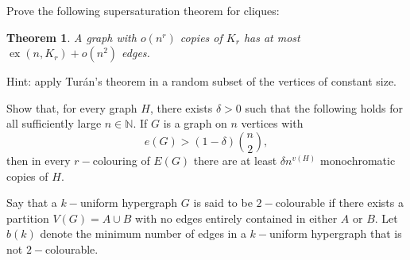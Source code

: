 \documentclass[english]{IMTexam}
\author{Isabella B. Amaral}
\newtheorem{theorem}{Theorem}
\DeclareMathOperator{\ex}{ex}
\begin{document}
	
	\maketitle
	
	\begin{questions}
		\question Prove the following supersaturation theorem for cliques:
		
		\begin{theorem}
			A graph with $ o(n^{r}) $ copies of $ K_r $ has at most $ \ex(n, K_r) + o(n^{2}) $ edges.
		\end{theorem}
	
		Hint: apply Turán’s theorem in a random subset of the vertices of constant size.
		
		\begin{solution}
			
		\end{solution}
		
		\question Show that, for every graph $ H $, there exists $ \delta > 0 $ such that the following holds for all sufficiently large $ n \in \mathbb{N} $. If $ G $ is a graph on $ n $ vertices with
		\[ e(G)>(1-\delta)\binom{n}{2}, \]
		then in every $ r- $colouring of $ E(G) $ there are at least $ \delta n^{v(H)} $ monochromatic copies of $ H $.
				
		\begin{solution}
			
		\end{solution}
		
		\question Say that a $ k- $uniform hypergraph $ G $ is said to be $ 2- $colourable if there exists a partition $ V(G) = A \cup B $ with no edges entirely contained in either $ A $ or $ B $. Let $ b(k) $ denote the minimum number of edges in a $ k- $uniform hypergraph that is not $ 2- $colourable.
		
		\begin{solution}
			
		\end{solution}
		

\end{questions}
\end{document}
